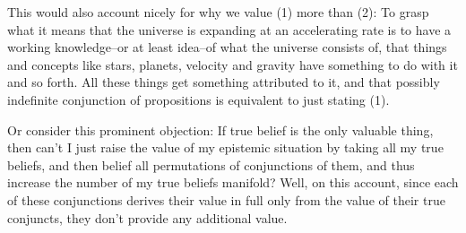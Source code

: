 \documentclass[12pt,numbers=noenddot]{scrartcl}
\begin{document}
This would also account nicely for why we value (1) more than (2): To grasp what it means that the universe is expanding at an accelerating rate is to have a working knowledge–or at least idea–of what the universe consists of, that things and concepts like stars, planets, velocity and gravity have something to do with it and so forth. All these things get something attributed to it, and that possibly indefinite conjunction of propositions is equivalent to just stating (1).

Or consider this prominent objection: If true belief is the only valuable thing, then can't I just raise the value of my epistemic situation by taking all my true beliefs, and then belief all permutations of conjunctions of them, and thus increase the number of my true beliefs manifold? Well, on this account, since each of these conjunctions derives their value in full only from the value of their true conjuncts, they don't provide any additional value.
\end{document}
